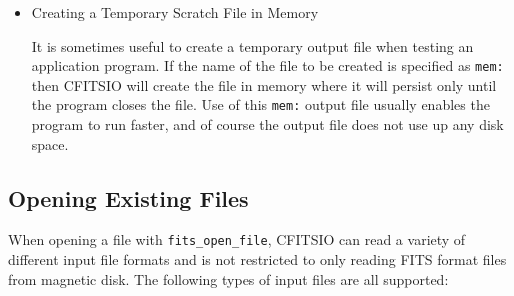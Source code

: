 \documentclass[11pt]{article}
\begin{document}
\begin{itemize}
\item Creating a Temporary Scratch File in Memory

It is sometimes useful to create a temporary output file when testing
an application program.  If the name of the file to be created is
specified as {\tt mem:} then CFITSIO will create the file in
memory where it will persist only until the program closes the file.
Use of this {\tt mem:} output file usually enables the program to run
faster, and of course the output file does not use up any disk space.


\end{itemize}

\subsection{Opening Existing Files}

When opening a file with {\tt fits\_open\_file}, CFITSIO can read a
variety of different input file formats and is not restricted to only
reading FITS format files from magnetic disk. The following types of
input files are all supported:
\end{document}
